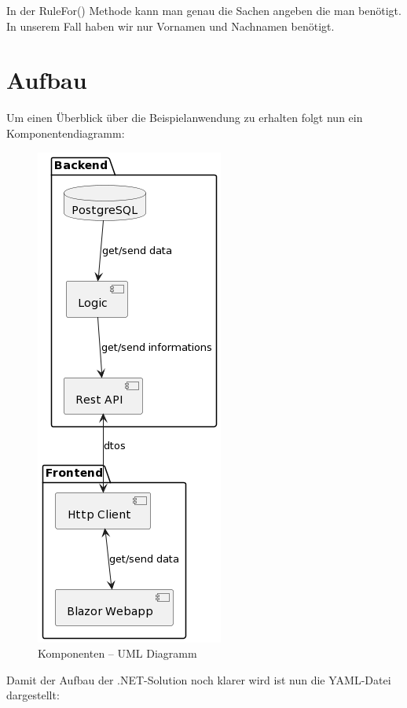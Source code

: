 In der RuleFor() Methode kann man genau die Sachen angeben die man benötigt. 
In unserem Fall haben wir nur Vornamen und Nachnamen benötigt.


\newpage
\section{Aufbau}

Um einen Überblick über die Beispielanwendung zu erhalten folgt nun ein Komponentendiagramm:

\begin{figure}[H]
    \centering
    \includegraphics[scale=0.5]{pics/KomponentenDiagramm.png}
    \caption{Komponenten -- UML Diagramm}
    \label{fig:impl:KomponentenDiagramm}
\end{figure}

\newpage
Damit der Aufbau der .NET-Solution noch klarer wird ist nun die YAML-Datei dargestellt:



